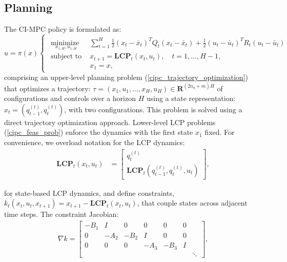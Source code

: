 \subsection{Planning}
The CI-MPC policy is formulated as: 
\begin{equation}
	u = \pi(x)
	\begin{cases}
		\begin{array}{ll}
			\underset{x_{1:H}, u_{1:H}}{\mbox{minimize }}  & \sum \limits_{t = 1}^{H} \frac{1}{2}(x_t - \bar{x}_t)^T Q_t (x_t - \bar{x}_t) + \frac{1}{2}(u_t - \bar{u}_t)^T R_t (u_t - \bar{u}_t) \label{ci_mpc_policy} \\
			\mbox{subject to } & x_{t+1} =\textbf{LCP}_t(x_t, u_t),  \quad t = 1, \dots, H-1, \\
			& x_1 = x,
		\end{array}
	\end{cases}
\end{equation}
comprising an upper-level planning problem (\ref{cipc_trajectory_optimization}) that optimizes a trajectory: $\tau = (x_1, u_1,\dots, x_H, u_H) \in \mathbf{R}^{(2 n_q + m) H}$ of configurations and controls over a horizon $H$ using a state representation: $x_t = (q^{(t)}_{t-1}, q^{(t)}_{t})$, with two configurations. This problem is solved using a direct trajectory optimization approach. Lower-level LCP problems (\ref{cipc_feas_prob}) enforce the dynamics with the first state $x_1$ fixed. For convenience, we overload notation for the LCP dynamics:
\begin{align}
	\textbf{LCP}_t(x_t, u_t) &= \begin{bmatrix} q^{(t)}_{t} \\  \textbf{LCP}_t(q_{t-1}^{(t)}, q_t^{(t)}, u_t) \end{bmatrix}, 
\end{align}

for state-based LCP dynamics, and define constraints, $k_t(x_t, u_t, x_{t+1}) = x_{t+1} - \textbf{LCP}_t(x_t, u_t)$, that couple states across adjacent time steps. The constraint Jacobian:
\begin{align}
	\nabla k = \begin{bmatrix} 
		-B_1 & I & 0 & 0 & 0 & 0 & \phantom{\cdots}\\
		0 & -A_2 & -B_2 & I & 0 & 0 & \phantom{\cdots}\\
		0 & 0 & 0 & -A_3 & -B_3 & I & \phantom{\cdots}\\ 
		&   &   &      &      &   & \ddots
	\end{bmatrix},
\end{align}

